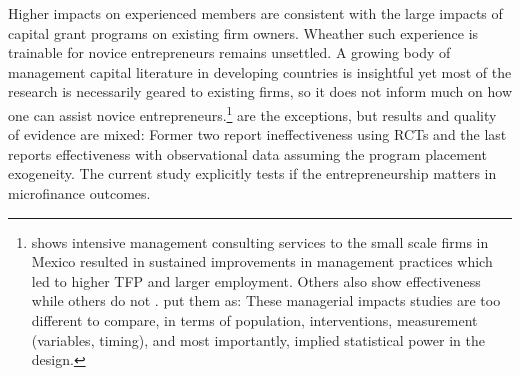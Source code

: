 	Higher impacts on experienced members are consistent with the large impacts of capital grant programs on existing firm owners. Wheather such experience is trainable for novice entrepreneurs remains unsettled. A growing body of management capital literature in developing countries is insightful yet most of the research is necessarily geared to existing firms, so it does not inform much on how one can assist novice entrepreneurs.\footnote{\citet{BruhnKarlanSchoar2018} shows intensive management consulting services to the small scale firms in Mexico resulted in sustained improvements in management practices which led to higher TFP and larger employment. Others also show effectiveness \citep{Calderon2011, Berge2012, Bloometal2013} while others do not \citep{Bruhn2012, KarlanKnightUdry2015}. \citet{MckenzieWoodruff2013} put them as: These managerial impacts studies are too different to compare, in terms of population, interventions, measurement (variables, timing), and most importantly, implied statistical power in the design. } \citet{KarlanValvidia2011, BruhnZia2011, Argent2014} are the exceptions, but results and quality of evidence are mixed: Former two report ineffectiveness using RCTs and the last reports effectiveness with observational data assuming the program placement exogeneity.  The current study explicitly tests if the entrepreneurship matters in microfinance outcomes. %

